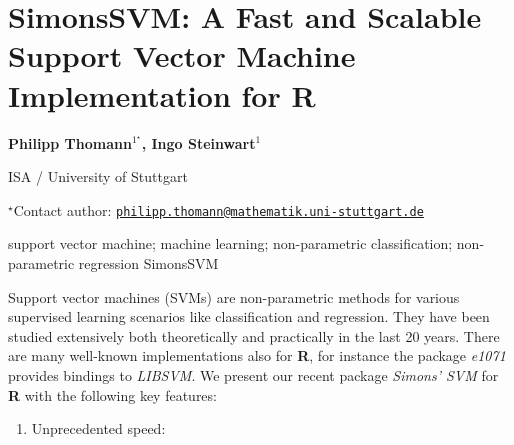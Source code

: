 \documentclass[\main/boa.tex]{subfiles}
\begin{document}
\section{SimonsSVM: A Fast and Scalable Support Vector Machine Implementation for
R}

\begin{center}
  {\bf {} Philipp Thomann$^{1^\star}$,  Ingo Steinwart$^{1}$}
\end{center}

\vskip 0.3cm

\begin{affiliations}
\begin{enumerate}
\begin{minipage}{0.915\textwidth}
\centering
\item ISA / University of Stuttgart \\[-2pt]
\end{minipage}
\end{enumerate}
$^\star$Contact author: \href{mailto:philipp.thomann@mathematik.uni-stuttgart.de}{\nolinkurl{philipp.thomann@mathematik.uni-stuttgart.de}}\\
\end{affiliations}

\vskip 0.5cm

\begin{minipage}{0.915\textwidth}
\keywords support vector machine; machine learning; non-parametric classification;
non-parametric regression
\packages {} SimonsSVM
\end{minipage}

\vskip 0.8cm

Support vector machines (SVMs) are non-parametric methods for various
supervised learning scenarios like classification and regression. They
have been studied extensively both theoretically and practically in the
last 20 years. There are many well-known implementations also for
\textbf{R}, for instance the package \emph{e1071} provides bindings to
\emph{LIBSVM}. We present our recent package \emph{Simons' SVM} for
\textbf{R} with the following key features:

\begin{enumerate}
\def\labelenumi{\arabic{enumi}.}
\tightlist
\item
  Unprecedented speed:
\end{enumerate}
\end{document}

